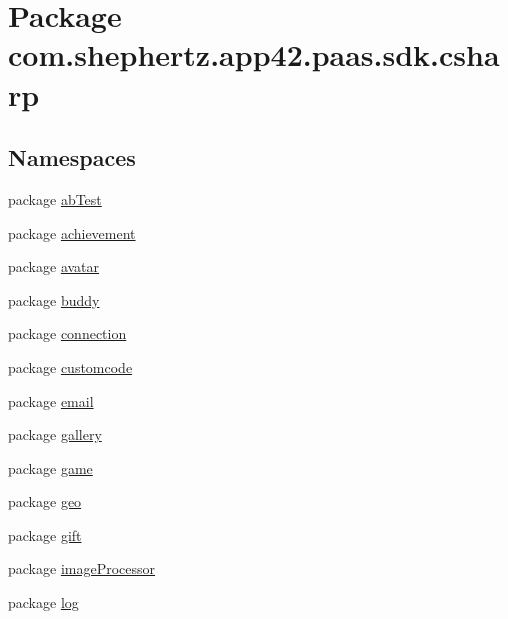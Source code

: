 \hypertarget{namespacecom_1_1shephertz_1_1app42_1_1paas_1_1sdk_1_1csharp}{\section{Package com.\+shephertz.\+app42.\+paas.\+sdk.\+csharp}
\label{namespacecom_1_1shephertz_1_1app42_1_1paas_1_1sdk_1_1csharp}
}
\subsection*{Namespaces}
\begin{DoxyCompactItemize}
\item 
package \hyperlink{namespacecom_1_1shephertz_1_1app42_1_1paas_1_1sdk_1_1csharp_1_1ab_test}{ab\+Test}
\item 
package \hyperlink{namespacecom_1_1shephertz_1_1app42_1_1paas_1_1sdk_1_1csharp_1_1achievement}{achievement}
\item 
package \hyperlink{namespacecom_1_1shephertz_1_1app42_1_1paas_1_1sdk_1_1csharp_1_1avatar}{avatar}
\item 
package \hyperlink{namespacecom_1_1shephertz_1_1app42_1_1paas_1_1sdk_1_1csharp_1_1buddy}{buddy}
\item 
package \hyperlink{namespacecom_1_1shephertz_1_1app42_1_1paas_1_1sdk_1_1csharp_1_1connection}{connection}
\item 
package \hyperlink{namespacecom_1_1shephertz_1_1app42_1_1paas_1_1sdk_1_1csharp_1_1customcode}{customcode}
\item 
package \hyperlink{namespacecom_1_1shephertz_1_1app42_1_1paas_1_1sdk_1_1csharp_1_1email}{email}
\item 
package \hyperlink{namespacecom_1_1shephertz_1_1app42_1_1paas_1_1sdk_1_1csharp_1_1gallery}{gallery}
\item 
package \hyperlink{namespacecom_1_1shephertz_1_1app42_1_1paas_1_1sdk_1_1csharp_1_1game}{game}
\item 
package \hyperlink{namespacecom_1_1shephertz_1_1app42_1_1paas_1_1sdk_1_1csharp_1_1geo}{geo}
\item 
package \hyperlink{namespacecom_1_1shephertz_1_1app42_1_1paas_1_1sdk_1_1csharp_1_1gift}{gift}
\item 
package \hyperlink{namespacecom_1_1shephertz_1_1app42_1_1paas_1_1sdk_1_1csharp_1_1image_processor}{image\+Processor}
\item 
package \hyperlink{namespacecom_1_1shephertz_1_1app42_1_1paas_1_1sdk_1_1csharp_1_1log}{log}

\end{DoxyCompactItemize}
